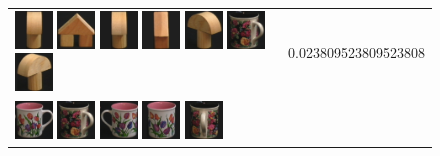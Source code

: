 {\begin{figure}[p]
\begin{tabular}{m{11cm} | m{3cm} |}
\includegraphics[width=1cm]{coil/beeld-5.eps}
\includegraphics[width=1cm]{coil/beeld-43.eps}
\includegraphics[width=1cm]{coil/beeld-2.eps}
\includegraphics[width=1cm]{coil/beeld-44.eps}
\includegraphics[width=1cm]{coil/beeld-4.eps}
\includegraphics[width=1cm]{coil/beeld-64.eps}
\includegraphics[width=1cm]{coil/beeld-3.eps}
& {\scriptsize 0.023809523809523808}
\\
\includegraphics[width=1cm]{coil/beeld-6.eps}
\includegraphics[width=1cm]{coil/beeld-64.eps}
\includegraphics[width=1cm]{coil/beeld-7.eps}
\includegraphics[width=1cm]{coil/beeld-8.eps}
\includegraphics[width=1cm]{coil/beeld-65.eps}

\end{tabular}
\end{figure}}
